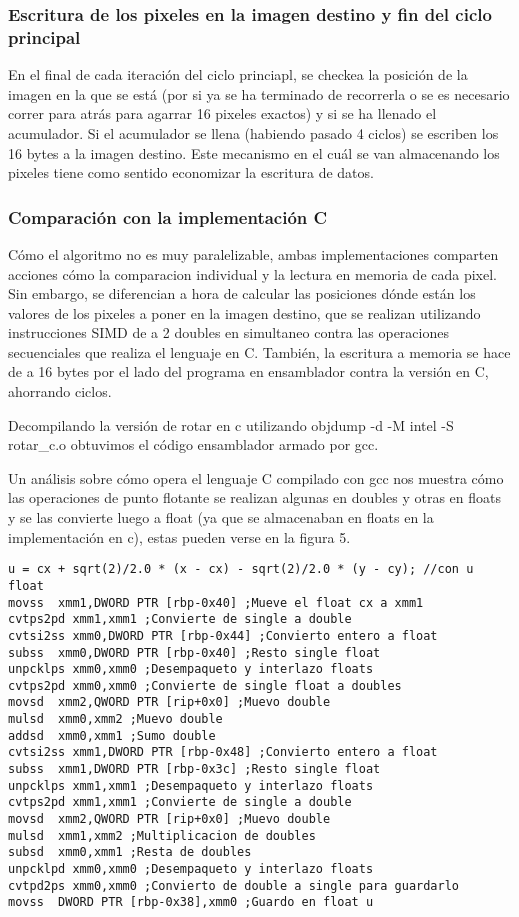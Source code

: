 \subsubsection{Escritura de los pixeles en la imagen destino y fin del ciclo principal}

En el final de cada iteración del ciclo princiapl, se checkea la posición de la imagen en la que se está (por si ya se ha terminado de recorrerla o se es necesario correr para atrás para agarrar 16 pixeles exactos) y si se ha llenado el acumulador. Si el acumulador se llena (habiendo pasado 4 ciclos) se escriben los 16 bytes a la imagen destino. Este mecanismo en el cuál se van almacenando los pixeles tiene como sentido economizar la escritura de datos.

\subsubsection{Comparación con la implementación C}
Cómo el algoritmo no es muy paralelizable, ambas implementaciones comparten acciones cómo la comparacion individual y la lectura en memoria de cada pixel. Sin embargo, se diferencian a hora de calcular las posiciones dónde están los valores de los pixeles a poner en la imagen destino, que se realizan utilizando instrucciones SIMD de a 2 doubles en simultaneo contra las operaciones secuenciales que realiza el lenguaje en C. También, la escritura a memoria se hace de a 16 bytes por el lado del programa en ensamblador contra la versión en C, ahorrando ciclos.

Decompilando la versión de rotar en c utilizando objdump -d -M intel -S rotar\_c.o obtuvimos el código ensamblador armado por gcc.


Un análisis sobre cómo opera el lenguaje C compilado con gcc nos muestra cómo las operaciones de punto flotante se realizan algunas en doubles y otras en floats y se las convierte luego a float (ya que se almacenaban en floats en la implementación en c), estas pueden verse en la figura 5.

\begin{verbatim}
u = cx + sqrt(2)/2.0 * (x - cx) - sqrt(2)/2.0 * (y - cy); //con u float
movss  xmm1,DWORD PTR [rbp-0x40] ;Mueve el float cx a xmm1
cvtps2pd xmm1,xmm1 ;Convierte de single a double
cvtsi2ss xmm0,DWORD PTR [rbp-0x44] ;Convierto entero a float
subss  xmm0,DWORD PTR [rbp-0x40] ;Resto single float
unpcklps xmm0,xmm0 ;Desempaqueto y interlazo floats
cvtps2pd xmm0,xmm0 ;Convierte de single float a doubles
movsd  xmm2,QWORD PTR [rip+0x0] ;Muevo double
mulsd  xmm0,xmm2 ;Muevo double
addsd  xmm0,xmm1 ;Sumo double
cvtsi2ss xmm1,DWORD PTR [rbp-0x48] ;Convierto entero a float
subss  xmm1,DWORD PTR [rbp-0x3c] ;Resto single float
unpcklps xmm1,xmm1 ;Desempaqueto y interlazo floats
cvtps2pd xmm1,xmm1 ;Convierte de single a double
movsd  xmm2,QWORD PTR [rip+0x0] ;Muevo double
mulsd  xmm1,xmm2 ;Multiplicacion de doubles
subsd  xmm0,xmm1 ;Resta de doubles
unpcklpd xmm0,xmm0 ;Desempaqueto y interlazo floats
cvtpd2ps xmm0,xmm0 ;Convierto de double a single para guardarlo
movss  DWORD PTR [rbp-0x38],xmm0 ;Guardo en float u
\end{verbatim}

